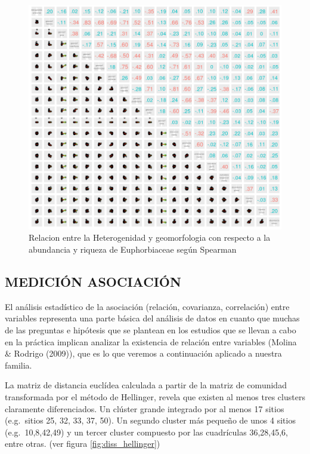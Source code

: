 \documentclass[11pt,]{article}
\begin{document}
\begin{figure}
\centering
\includegraphics{spearman.png}
\caption{\label{fig:spearman}Relacion entre la Heterogenidad y
geomorfologia con respecto a la abundancia y riqueza de Euphorbiaceae
según Spearman}
\end{figure}

\subsection{MEDICIÓN ASOCIACIÓN}\label{mediciuxf3n-asociaciuxf3n}

El análisis estadístico de la asociación (relación, covarianza,
correlación) entre variables representa una parte básica del análisis de
datos en cuanto que muchas de las preguntas e hipótesis que se plantean
en los estudios que se llevan a cabo en la práctica implican analizar la
existencia de relación entre variables (Molina \& Rodrigo (2009)), que
es lo que veremos a continuación aplicado a nuestra familia.

La matriz de distancia euclídea calculada a partir de la matriz de
comunidad transformada por el método de Hellinger, revela que existen al
menos tres clusters claramente diferenciados. Un clúster grande
integrado por al menos 17 sitios (e.g.~sitios 25, 32, 33, 37, 50). Un
segundo cluster más pequeño de unos 4 sitios (e.g.~10,8,42,49) y un
tercer cluster compuesto por las cuadrículas 36,28,45,6, entre otras.
(ver figura \ref{fig:diss_hellinger})
\end{document}

